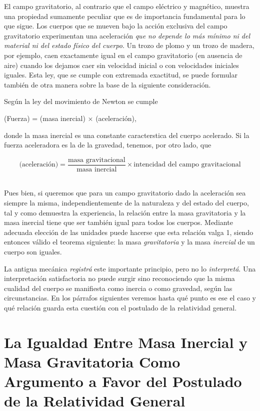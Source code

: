 \documentclass[spanish]{book}
\begin{document}
El campo gravitatorio, al contrario que el campo eléctrico y magnético, muestra una
propiedad sumamente peculiar que es de importancia fundamental para lo que sigue.
Los cuerpos que se mueven bajo la acción exclusiva del campo gravitatorio
experimentan una aceleración \textit{que no depende lo más mínimo ni del material ni del estado
físico del cuerpo}. Un trozo de plomo y un trozo de madera, por ejemplo, caen
exactamente igual en el campo gravitatorio (en ausencia de aire) cuando los
dejamos caer sin velocidad inicial o con velocidades iniciales iguales. Esta ley, que se
cumple con extremada exactitud, se puede formular también de otra manera sobre la
base de la siguiente consideración.

Según la ley del movimiento de Newton se cumple

\begin{center}
(Fuerza) = (masa inercial) $\times$ (aceleración), 
\par
\end{center}

\noindent donde la masa inercial es una constante caracterstica del cuerpo acelerado. Si la
fuerza aceleradora es la de la gravedad, tenemos, por otro lado, que

\[\mbox{(aceleración)}=\frac{\mbox{masa gravitacional}}{\mbox{masa inercial}}\times\mbox{intencidad del campo gravitacional}\]
 ~

Pues bien, si queremos que para un campo gravitatorio dado la aceleración sea
siempre la misma, independientemente de la naturaleza y del estado del cuerpo, tal y
como demuestra la experiencia, la relación entre la masa gravitatoria y la masa
inercial tiene que ser también igual para todos los cuerpos. Mediante adecuada
elección de las unidades puede hacerse que esta relación valga 1, siendo entonces
válido el teorema siguiente: la masa \textit{gravitatoria} y la masa \textit{inercial} de un cuerpo son
iguales.

La antigua mecánica \textit{registrá} este importante principio, pero no lo \textit{interpretá}. Una
interpretación satisfactoria no puede surgir sino reconociendo que la misma cualidad
del cuerpo se manifiesta como inercia o como gravedad, según las circunstancias.
En los párrafos siguientes veremos hasta qué punto es ese el caso y qué relación
guarda esta cuestión con el postulado de la relatividad general.


\chapter{La Igualdad Entre Masa Inercial y Masa Gravitatoria
Como Argumento a Favor del Postulado de la Relatividad General}
\end{document}

